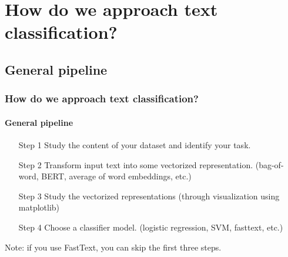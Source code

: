 \documentclass{beamer}
\begin{document}

\section{How do we approach text classification?}

\subsection{General pipeline}
\begin{frame}
    \frametitle{How do we approach text classification?}
    \framesubtitle{General pipeline}
    \begin{enumerate}
        \item[Step 1] Study the content of your dataset and identify your task. 
        \item[Step 2] Transform input text into some vectorized representation. (bag-of-word, BERT, average of word embeddings, etc.)
        \item[Step 3] Study the vectorized representations (through visualization using matplotlib)
        \item[Step 4] Choose a classifier model. (logistic regression, SVM, fasttext, etc.)
    \end{enumerate}
    Note: if you use FastText, you can skip the first three steps.
\end{frame}
\end{document}
